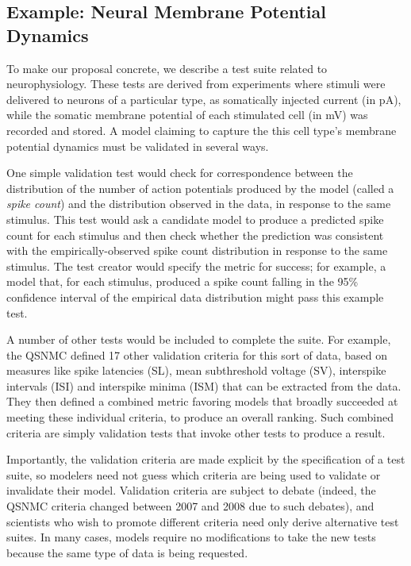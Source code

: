 \documentclass[11pt,letterpaper]{article}
\begin{document}
\subsection{Example: Neural Membrane Potential Dynamics} To make our proposal concrete, we describe a test suite related to neurophysiology. These tests are derived from experiments where stimuli were delivered to neurons of a particular type, as somatically injected current (in pA), while the somatic membrane potential of each stimulated cell (in mV) was recorded and stored.  A model claiming to capture the this cell type's membrane potential dynamics must be validated in several ways. 

One simple validation test would check for correspondence between the distribution of the number of action potentials produced by the model (called a \emph{spike count}) and the distribution observed in the data, in response to the same stimulus. This test would ask a candidate model to produce a predicted spike count for each stimulus and then check whether the prediction was consistent with the empirically-observed spike count distribution in response to the same stimulus.  The test creator would specify the metric for success; for example, a model that, for each stimulus, produced a spike count falling in the 95\% confidence interval of the empirical data distribution might pass this example test. 

A number of other tests would be included to complete the suite. For example, the QSNMC defined 17 other validation criteria for this sort of data, based on measures like spike latencies (SL), mean subthreshold voltage (SV), interspike intervals (ISI) and interspike minima (ISM) that can be extracted from the data\cite{jolivet_quantitative_2008}. They then defined a combined metric favoring models that broadly succeeded at meeting these individual criteria, to produce an overall ranking. Such combined criteria are simply validation tests that invoke other tests to produce a result.

Importantly, the validation criteria are made explicit by the specification of a test suite, so modelers need not guess which criteria are being used to validate or invalidate their model. Validation criteria are subject to debate (indeed, the QSNMC criteria changed between 2007 and 2008 due to such debates), and scientists who wish to promote different criteria need only derive alternative test suites. In many cases, models require no modifications to take the new tests because the same type of data is being requested.
\end{document}
